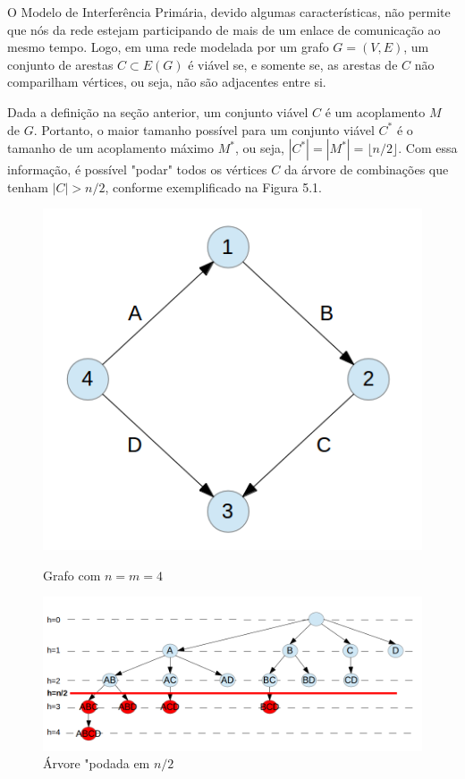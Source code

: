 O Modelo de Interferência Primária, devido algumas características, não permite que nós da rede estejam participando de mais de um enlace de comunicação ao mesmo tempo. Logo, em uma rede modelada por um grafo $G=(V,E)$, um conjunto de arestas $C \subset E(G)$ é viável se, e somente se, as arestas de $C$ não comparilham vértices, ou seja, não são adjacentes entre si. 

Dada a definição na seção anterior, um conjunto viável $C$ é um acoplamento $M$ de $G$. Portanto, o maior tamanho possível para um conjunto viável $C^*$ é o tamanho de um acoplamento máximo $M^*$, ou seja, $|C^*| = |M^*| = \lfloor n/2 \rfloor$. Com essa informação, é possível "podar" todos os vértices $C$ da árvore de combinações que tenham $|C|>n/2$, conforme exemplificado na Figura 5.1.

\begin{figure}[ht] 
  \label{fig:otimizacao} 
  \begin{minipage}[b]{0.5\linewidth}
    \centering
    \includegraphics[width=0.5\linewidth]{figs/otim1.png} 
    \caption{Grafo com $n=m=4$} 
    \vspace{4ex}
  \end{minipage}%
  \begin{minipage}[b]{0.5\linewidth}
    \centering
    \includegraphics[width=1\linewidth]{figs/otim2.png} 
    \caption{Árvore "podada em $n/2$} 
    \vspace{4ex}
  \end{minipage} 
\end{figure}

